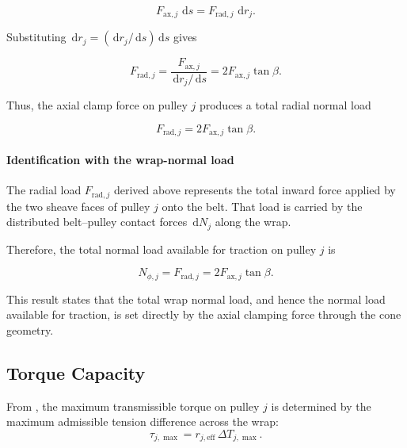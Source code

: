 \documentclass[11pt]{article}
\numberwithin{equation}{section}
\newcommand{\dd}{\,\mathrm{d}}
\begin{document}
\[
F_{\mathrm{ax},j}\,\dd s
=
F_{\mathrm{rad},j}\,\dd r_j.
\]

Substituting
\(
\dd r_j = \left(\dd r_j/\dd s\right)\dd s
\)
gives

\begin{equation}
F_{\mathrm{rad},j}
=
\frac{F_{\mathrm{ax},j}}{\dd r_j/\dd s}
=
2F_{\mathrm{ax},j}\tan\beta.
\label{eq:Frad_from_Fax}
\end{equation}

Thus, the axial clamp force on pulley \(j\) produces a total radial normal load

\begin{equation}
F_{\mathrm{rad},j} = 2F_{\mathrm{ax},j}\tan\beta.
\label{eq:Frad_simple}
\end{equation}

\paragraph{Identification with the wrap-normal load}

The radial load \(F_{\mathrm{rad},j}\) derived above represents the total inward
force applied by the two sheave faces of pulley \(j\) onto the belt.
That load is carried by the distributed belt--pulley contact forces
\(\dd N_j\) along the wrap.

Therefore, the total normal load available for traction on pulley \(j\) is

\begin{equation}
\boxed{
N_{\phi,j} = F_{\mathrm{rad},j} = 2F_{\mathrm{ax},j}\tan\beta.
}
\label{eq:Nphi_from_Fax}
\end{equation}

This result states that the total wrap normal load, and hence the normal
load available for traction, is set directly by the axial clamping force
through the cone geometry.

\subsection{Torque Capacity}
\label{sec:tau_capacity}

From , the maximum transmissible torque on pulley
\(j\) is determined by the maximum admissible tension difference across the
wrap:
\begin{equation}
\tau_{j,\max}
=
r_{j,\mathrm{eff}}\,\Delta T_{j,\max}.
\label{eq:tau_max_repeat}
\end{equation}
\end{document}
